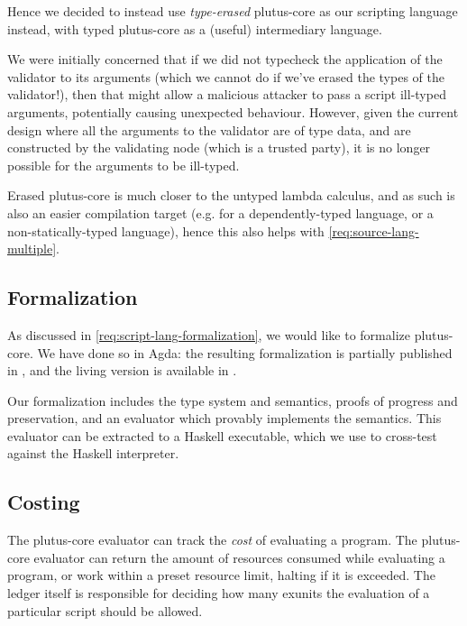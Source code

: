 Hence we decided to instead use \emph{type-erased} \gls{plutus-core} as our scripting language instead, with typed \gls{plutus-core} as a (useful) intermediary language.

We were initially concerned that if we did not typecheck the application of the \gls{validator} to its arguments (which we cannot do if we've erased the types of the \gls{validator}!), then that might allow a malicious attacker to pass a script ill-typed arguments, potentially causing unexpected behaviour.
However, given the current design where all the arguments to the \gls{validator} are of type \gls{data}, and are constructed by the validating node (which is a trusted party), it is no longer possible for the arguments to be ill-typed.

Erased \gls{plutus-core} is much closer to the untyped lambda calculus, and as such is also an easier compilation target (e.g. for a dependently-typed language, or a non-statically-typed language), hence this also helps with \cref{req:source-lang-multiple}.

\subsection{Formalization}

As discussed in \cref{req:script-lang-formalization}, we would like to formalize \gls{plutus-core}.
We have done so in Agda: the resulting formalization is partially published in \textcite{chapman2019system}, and the living version is available in \textcite{plutus-repo}.

Our formalization includes the type system and semantics, proofs of progress and preservation, and an evaluator which provably implements the semantics.
This evaluator can be extracted to a Haskell executable, which we use to cross-test against the Haskell interpreter.

\subsection{Costing}
\label{sec:costing}

The \gls{plutus-core} evaluator can track the \emph{cost} of evaluating a program.
The \gls{plutus-core} evaluator can return the amount of resources consumed while evaluating a program, or work within a preset resource limit, halting if it is exceeded.
The ledger itself is responsible for deciding how many \gls{exunits} the evaluation of a particular \gls{script} should be allowed.

